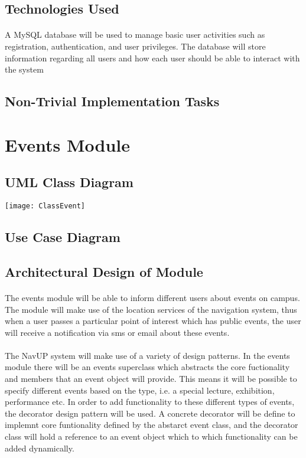 \documentclass{article}
\begin{document}
\subsection{Technologies Used}
\paragraph{}A MySQL database will be used to manage basic user activities such as registration, authentication, and user privileges. The database will store information regarding all users and how each user should be able to interact with the system

\subsection{Non-Trivial Implementation Tasks}


\section{Events Module}
\subsection{UML Class Diagram}
\texttt{[image: ClassEvent]}
\subsection {Use Case Diagram}

\subsection{Architectural Design of Module}
\paragraph{}The events module will be able to inform different users about events on campus. The module will make use of the location services of the navigation system, thus when a user passes a particular point of interest which has public events, the user will receive a notification via sms or email about these events. 

\paragraph{} The NavUP system will make use of a variety of design patterns. In the events module there will be an events superclass which abstracts the core fuctionality and members that an event object will provide. This means it will be possible to specify different events based on the type, i.e. a special lecture, exhibition, performance etc. In order to add functionality to these different types of events, the decorator design pattern will be used. A concrete decorator will be define to implemnt core funtionality defined by the abstarct event class, and the decorator class will hold a reference to an event object which to which functionality can be added dynamically.
\end{document}
